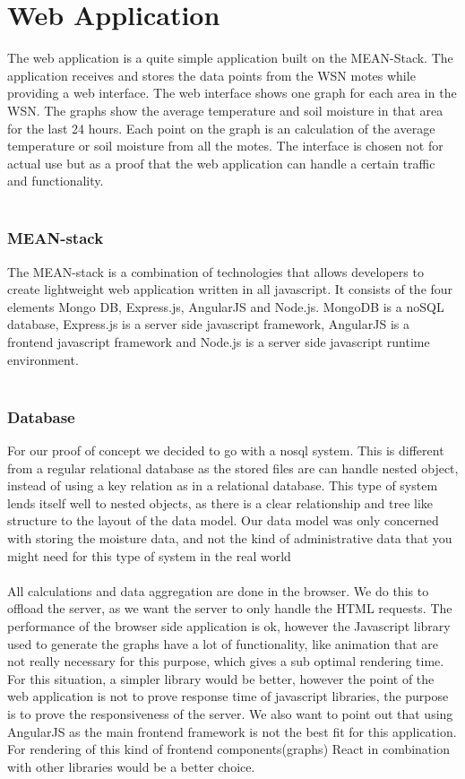 \documentclass[]{uiophd}
\begin{document}
\section{Web Application}
The web application is a quite simple application built on the MEAN-Stack. The application receives and stores the data points from the WSN motes while providing a web interface. The web interface shows one graph for each area in the WSN. The graphs show the average temperature and soil moisture in that area for the last 24 hours. Each point on the graph is an calculation of the average temperature or soil moisture from all the motes. The interface is chosen not for actual use but as a proof that the web application can handle a certain traffic and functionality. 
\\\\
\subsubsection{MEAN-stack}
The MEAN-stack is a combination of technologies that allows developers to create lightweight web application written in all javascript. It consists of the four elements Mongo DB, Express.js, AngularJS and Node.js. MongoDB is a noSQL database, Express.js is a server side javascript framework, AngularJS is a frontend javascript framework and Node.js is a server side javascript runtime environment. 
\\\\
\subsubsection{Database}
For our proof of concept we decided to go with a nosql system. This is different from a regular relational database as the stored files are can handle nested object, instead of using a key relation as in a relational database. This type of system lends itself well to nested objects, as there is a clear relationship and tree like structure to the layout of the data model. Our data model was only concerned with storing the moisture data, and not the kind of administrative data that you might need for this type of system in the real world
\\\\
All calculations and data aggregation are done in the browser. We do this to offload the server, as we want the server to only handle the HTML requests. The performance of the browser side application is ok, however the Javascript library used to generate the graphs have a lot of functionality, like animation that are not really necessary for this purpose, which gives a sub optimal rendering time. For this situation, a simpler library would be better, however the point of the web application is not to prove response time of javascript libraries, the purpose is to prove the responsiveness of the server. We also want to point out that using AngularJS as the main frontend framework is not the best fit for this application. For rendering of this kind of frontend components(graphs) React in combination with other libraries would be a better choice. 
\end{document}
